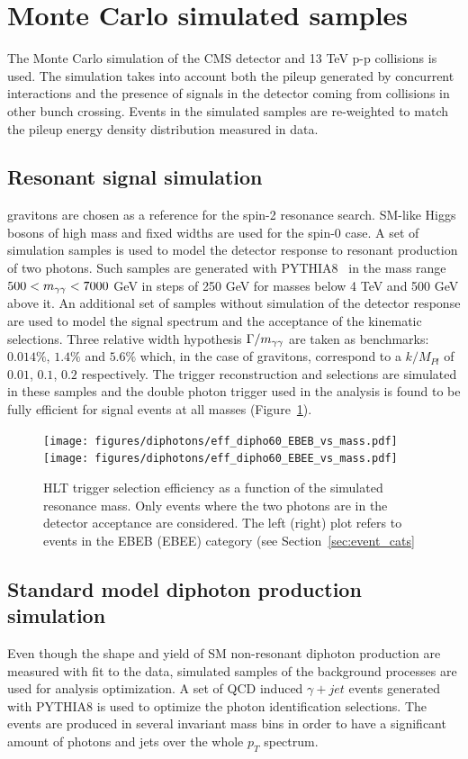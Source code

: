 \clearpage
\section{Monte Carlo simulated samples}
The Monte Carlo simulation of the CMS detector and 13 TeV p-p collisions is used. The simulation
takes into account both the pileup generated by concurrent interactions and the presence of
signals in the detector coming from collisions in other bunch crossing. Events in the simulated samples
are re-weighted to match the pileup energy density distribution measured in data.

\subsection{Resonant signal simulation}
\RS gravitons are chosen as a reference for the spin-2 resonance search. SM-like Higgs bosons of high mass and
fixed widths are used for the spin-0 case.
A set of simulation samples is used to model the detector response to resonant production of two photons.
Such samples are generated with PYTHIA8~\cite{pythia8} in the mass range $500 < m_{\gamma\gamma} < 7000$ GeV in steps of 250 GeV for
masses below 4 TeV and 500 GeV above it. An additional set of samples without simulation of the detector
response are used to model the signal spectrum and the acceptance of the kinematic selections.
Three relative width hypothesis $\Gamma/m_{\gamma\gamma}$ are taken as benchmarks: $0.014\%$, $1.4\%$ and $5.6\%$ which,
in the case of \RS gravitons, correspond to a $k/M_{Pl}$ of $0.01$, $0.1$, $0.2$ respectively.
The trigger reconstruction and selections are simulated in these samples and the double photon trigger
used in the analysis is found to be fully efficient for signal events at all masses (Figure~\ref{fig:trig_eff_sig}).

\begin{figure}[h!]
  \centering
  \texttt{[image: figures/diphotons/eff\_dipho60\_EBEB\_vs\_mass.pdf]}
  \texttt{[image: figures/diphotons/eff\_dipho60\_EBEE\_vs\_mass.pdf]}
  \caption{HLT trigger selection efficiency as a function of the simulated resonance mass. Only events where the two photons are
    in the detector acceptance are considered. The left (right) plot refers to events in the EBEB (EBEE)
    category (see Section~\ref{sec:event_cats}}
  \label{fig:trig_eff_sig}
\end{figure}

\subsection{Standard model diphoton production simulation}
Even though the shape and yield of SM non-resonant diphoton production are measured with fit to the data,
simulated samples of the background processes are used for analysis optimization. A set of QCD induced
$\gamma+jet$ events generated with PYTHIA8 is used to optimize the photon identification selections.
The events are produced in several invariant mass bins in order to have a significant amount of photons and
jets over the whole $p_T$ spectrum.

